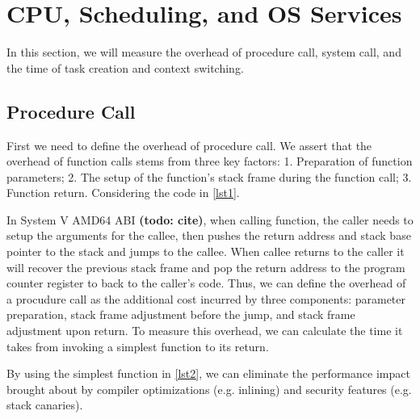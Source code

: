 \section{CPU, Scheduling, and OS Services}
\label{sec:cpu}
In this section, we will measure the overhead of procedure call, system call, and the time of task creation and context switching.

\subsection{Procedure Call}
First we need to define the overhead of procedure call. We assert that the overhead of function calls stems from three key factors: 1. Preparation of function parameters; 2. The setup of the function's stack frame during the function call; 3. Function return. Considering the code in \ref{lst1}. 

In System V AMD64 ABI \textbf{(todo: cite)}, when calling function, the caller needs to setup the arguments for the callee, then pushes the return address and stack base pointer to the stack and jumps to the callee. When callee returns to the caller it will recover the previous stack frame and pop the return address to the program counter register to back to the caller's code. Thus, we can define the overhead of a procudure call as the additional cost incurred by three components: parameter preparation, stack frame adjustment before the jump, and stack frame adjustment upon return. To measure this overhead, we can calculate the time it takes from invoking a simplest function to its return.

By using the simplest function in \ref{lst2}, we can eliminate the performance impact brought about by compiler optimizations (e.g. inlining) and security features (e.g. stack canaries).

